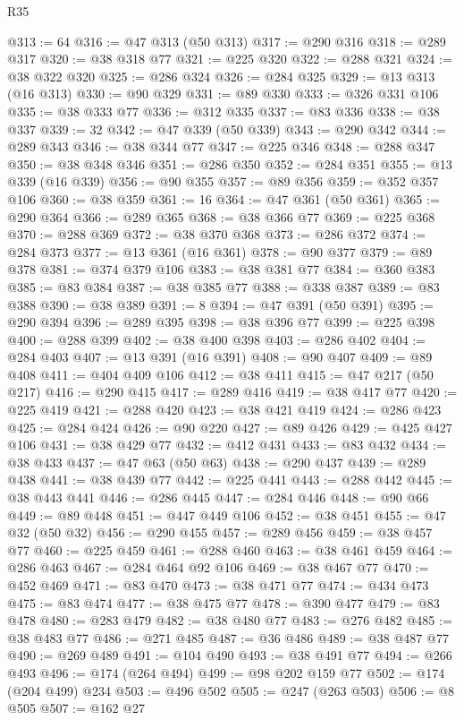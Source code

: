 \begin{lexlean}{R35}
\begin{coremodule}
@313 := 64
@316 := @47 @313 (@50 @313)
@317 := @290 @316
@318 := @289 @317
@320 := @38 @318 @77
@321 := @225 @320
@322 := @288 @321
@324 := @38 @322 @320
@325 := @286 @324
@326 := @284 @325
@329 := @13 @313 (@16 @313)
@330 := @90 @329
@331 := @89 @330
@333 := @326 @331 @106
@335 := @38 @333 @77
@336 := @312 @335
@337 := @83 @336
@338 := @38 @337
@339 := 32
@342 := @47 @339 (@50 @339)
@343 := @290 @342
@344 := @289 @343
@346 := @38 @344 @77
@347 := @225 @346
@348 := @288 @347
@350 := @38 @348 @346
@351 := @286 @350
@352 := @284 @351
@355 := @13 @339 (@16 @339)
@356 := @90 @355
@357 := @89 @356
@359 := @352 @357 @106
@360 := @38 @359
@361 := 16
@364 := @47 @361 (@50 @361)
@365 := @290 @364
@366 := @289 @365
@368 := @38 @366 @77
@369 := @225 @368
@370 := @288 @369
@372 := @38 @370 @368
@373 := @286 @372
@374 := @284 @373
@377 := @13 @361 (@16 @361)
@378 := @90 @377
@379 := @89 @378
@381 := @374 @379 @106
@383 := @38 @381 @77
@384 := @360 @383
@385 := @83 @384
@387 := @38 @385 @77
@388 := @338 @387
@389 := @83 @388
@390 := @38 @389
@391 := 8
@394 := @47 @391 (@50 @391)
@395 := @290 @394
@396 := @289 @395
@398 := @38 @396 @77
@399 := @225 @398
@400 := @288 @399
@402 := @38 @400 @398
@403 := @286 @402
@404 := @284 @403
@407 := @13 @391 (@16 @391)
@408 := @90 @407
@409 := @89 @408
@411 := @404 @409 @106
@412 := @38 @411
@415 := @47 @217 (@50 @217)
@416 := @290 @415
@417 := @289 @416
@419 := @38 @417 @77
@420 := @225 @419
@421 := @288 @420
@423 := @38 @421 @419
@424 := @286 @423
@425 := @284 @424
@426 := @90 @220
@427 := @89 @426
@429 := @425 @427 @106
@431 := @38 @429 @77
@432 := @412 @431
@433 := @83 @432
@434 := @38 @433
@437 := @47 @63 (@50 @63)
@438 := @290 @437
@439 := @289 @438
@441 := @38 @439 @77
@442 := @225 @441
@443 := @288 @442
@445 := @38 @443 @441
@446 := @286 @445
@447 := @284 @446
@448 := @90 @66
@449 := @89 @448
@451 := @447 @449 @106
@452 := @38 @451
@455 := @47 @32 (@50 @32)
@456 := @290 @455
@457 := @289 @456
@459 := @38 @457 @77
@460 := @225 @459
@461 := @288 @460
@463 := @38 @461 @459
@464 := @286 @463
@467 := @284 @464 @92 @106
@469 := @38 @467 @77
@470 := @452 @469
@471 := @83 @470
@473 := @38 @471 @77
@474 := @434 @473
@475 := @83 @474
@477 := @38 @475 @77
@478 := @390 @477
@479 := @83 @478
@480 := @283 @479
@482 := @38 @480 @77
@483 := @276 @482
@485 := @38 @483 @77
@486 := @271 @485
@487 := @36 @486
@489 := @38 @487 @77
@490 := @269 @489
@491 := @104 @490
@493 := @38 @491 @77
@494 := @266 @493
@496 := @174 (@264 @494)
@499 := @98 @202 @159 @77
@502 := @174 (@204 @499) @234
@503 := @496 @502
@505 := @247 (@263 @503)
@506 := @8 @505
@507 := @162 @27

\end{coremodule}
\end{lexlean}
